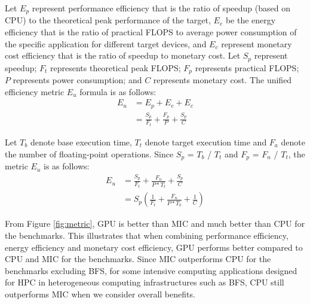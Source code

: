 
Let $E_{p}$ represent performance efficiency that is the ratio of speedup (based on CPU) to the theoretical peak performance of the target, $E_{e}$ be the energy efficiency that is the ratio of practical FLOPS to average power consumption of the specific application for different target devices, and $E_{c}$ represent monetary cost efficiency that is the ratio of speedup to monetary cost. Let $S_{p}$ represent speedup; $F_{t}$ represents theoretical peak FLOPS; $F_{p}$ represents practical FLOPS; $P$ represents power consumption; and $C$ represents monetary cost. The unified efficiency metric $E_{u}$ formula is as follows:
  \begin{equation}\label{equ:metric1}
    \begin{split}
  {E_{u}} &  = E_{p}+E_{e}+E_{c} \\
   & = \frac{S_{p}}{F_{t}}+\frac{F_{p}}{P}+\frac{S_{p}}{C}
  \end{split}
\end{equation}
  
Let $T_{b}$ denote base execution time, $T_{t}$ denote target execution time and $F_{a}$ denote the number of floating-point operations. Since $S_{p}$ = $T_{b}$ / $T_{t}$ and $F_{p}$ = $F_{n}$ / $T_{t}$, the metric $E_{u}$ is as follows:
  \begin{equation}\label{equ:metric1}
    \begin{split}
  {E_{u}} &  = \frac{S_{p}}{F_{t}}+\frac{F_{n}}{P*T_{t}}+\frac{S_{p}}{C} \\
   & = {S_{p}}(\frac{1}{F_{t}}+\frac{F_{n}}{P*T_{b}}+\frac{1}{C})
  \end{split}
\end{equation}

  
 From Figure \ref{fig:metric}, GPU is better than MIC and much better than CPU for the benchmarks. This illustrates that when combining performance efficiency, energy efficiency and monetary cost efficiency, GPU performs better compared to CPU and MIC for the benchmarks. Since MIC outperforms CPU for the benchmarks excluding BFS, for some intensive computing applications designed for HPC in heterogeneous computing infrastructures such as BFS, CPU still outperforms MIC when we consider overall benefits.
